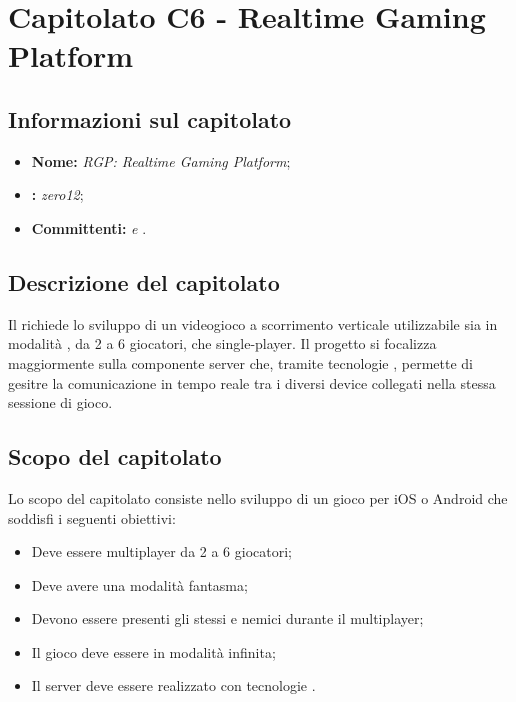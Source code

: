 \section{Capitolato C6 - Realtime Gaming Platform}
\label{C6}
\subsection{Informazioni sul capitolato}
\begin{itemize}
	\item \textbf{Nome:} \textit{RGP: Realtime Gaming Platform};
	\item \textbf{:} \textit{zero12};
	\item \textbf{Committenti:} \textit{\VT{} e \CR{}}.
\end{itemize}

\subsection{Descrizione del capitolato}
Il  richiede lo sviluppo di un videogioco a scorrimento verticale utilizzabile sia in modalità , da 2 a 6 giocatori, che single-player. Il progetto si focalizza maggiormente sulla componente server che, tramite tecnologie , permette di gesitre la comunicazione in tempo reale tra i diversi device collegati nella stessa sessione di gioco.

\subsection{Scopo del capitolato}
Lo scopo del capitolato consiste nello sviluppo di un gioco per iOS o Android che soddisfi i seguenti obiettivi:
\begin{itemize}
	\item Deve essere multiplayer da 2 a 6 giocatori;
	\item Deve avere una modalità fantasma;
	\item Devono essere presenti gli stessi  e nemici durante il multiplayer;
	\item Il gioco deve essere in modalità infinita;
	\item Il server deve essere realizzato con tecnologie \textit{}.
\end{itemize}

